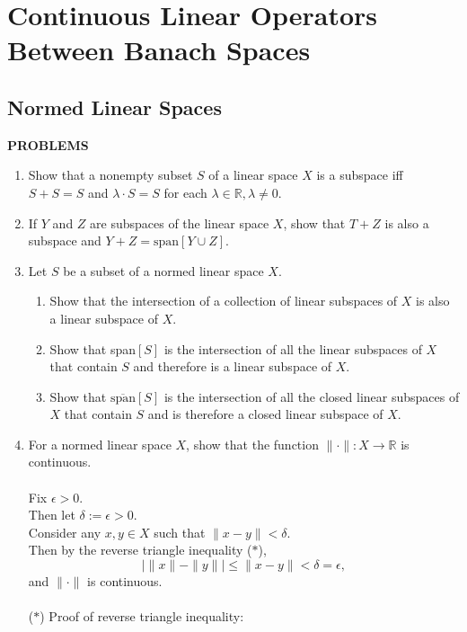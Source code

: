 \chapter{Continuous Linear Operators Between Banach Spaces}

\section{Normed Linear Spaces}


\begin{center}
	\textbf{PROBLEMS}
\end{center}
\begin{enumerate}
	\setcounter{enumi}{0}
    \item Show that a nonempty subset $S$ of a linear space $X$ is a subspace iff $S+S=S$ and $\lambda \cdot S=S$ for each $\lambda\in\mathbb{R},\lambda\neq0$.
    \item If $Y$ and $Z$ are subspaces of the linear space $X$, show that $T+Z$ is also a subspace and $Y+Z=\text{span}[Y\cup Z]$. 
    \item Let $S$ be a subset of a normed linear space $X$.
    \begin{enumerate}[label=(\roman*),align=left]
        \item Show that the intersection of a collection of linear subspaces of $X$ is also a linear subspace of $X$.
        \item Show that span$[S]$ is the intersection of all the linear subspaces of $X$ that contain $S$ and therefore is a linear subspace of $X$.
        \item Show that $\overline{\text{span}}[S]$ is the intersection of all the closed linear subspaces of $X$ that contain $S$ and is therefore a closed linear subspace of $X$. 
    \end{enumerate}
    \item For a normed linear space $X$, show that the function $\|\cdot\|:X\to\mathbb{R}$ is continuous.\\
    \\Fix $\epsilon>0$.
    \\Then let $\delta:=\epsilon>0$.
    \\Consider any $x,y\in X$ such that $\|x-y\|<\delta$.
    \\Then by the reverse triangle inequality ($\ast$),
    \[
        |\|x\|-\|y\||\le\|x-y\|<\delta=\epsilon,
    \]
    and $\|\cdot\|$ is continuous.\\
    \\($\ast$) Proof of reverse triangle inequality:

\end{enumerate}
